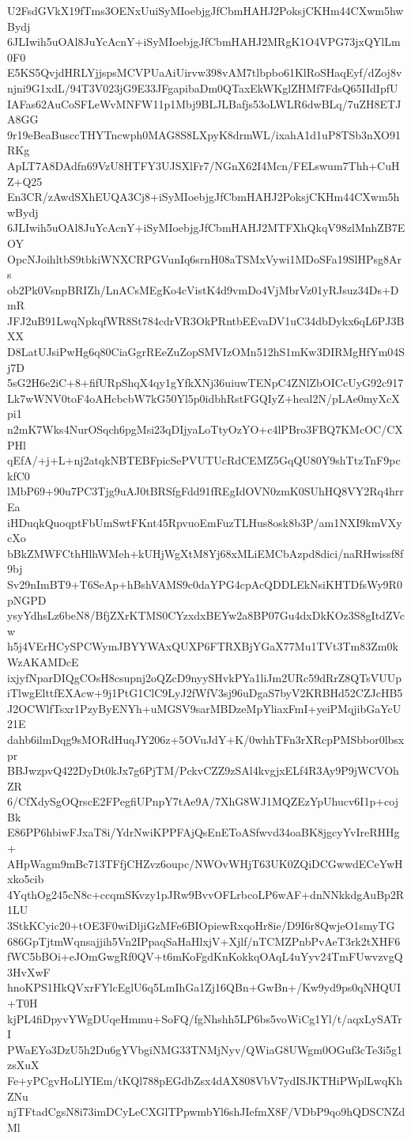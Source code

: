 U2FsdGVkX19fTms3OENxUuiSyMIoebjgJfCbmHAHJ2PoksjCKHm44CXwm5hwBydj
6JLIwih5uOAl8JuYcAcnY+iSyMIoebjgJfCbmHAHJ2MRgK1O4VPG73jxQYlLm0F0
E5KS5QvjdHRLYjjspsMCVPUaAiUirvw398vAM7tlbpbo61KlRoSHaqEyf/dZoj8v
njni9G1xdL/94T3V023jG9E33JFgapibaDm0QTaxEkWKglZHMf7FdsQ65IIdIpfU
IAFas62AuCoSFLeWvMNFW11p1Mbj9BLJLBafjs53oLWLR6dwBLq/7uZH8ETJA8GG
9r19eBeaBusccTHYTncwph0MAG8S8LXpyK8drmWL/ixahA1d1uP8TSb3nXO91RKg
ApLT7A8DAdfn69VzU8HTFY3UJSXlFr7/NGnX62I4Mcn/FELswum7Thh+CuHZ+Q25
En3CR/zAwdSXhEUQA3Cj8+iSyMIoebjgJfCbmHAHJ2PoksjCKHm44CXwm5hwBydj
6JLIwih5uOAl8JuYcAcnY+iSyMIoebjgJfCbmHAHJ2MTFXhQkqV98zlMnhZB7EOY
OpcNJoihltbS9tbkiWNXCRPGVunIq6srnH08aTSMxVywi1MDoSFa19SlHPsg8Ars
ob2Pk0VsnpBRIZh/LnACsMEgKo4cVistK4d9vmDo4VjMbrVz01yRJsuz34Ds+DmR
JFJ2uB91LwqNpkqfWR8St784cdrVR3OkPRntbEEvaDV1uC34dbDykx6qL6PJ3BXX
D8LatUJsiPwHg6q80CiaGgrREeZuZopSMVIzOMn512hS1mKw3DIRMgHfYm04Sj7D
5sG2H6e2iC+8+fifURpShqX4qy1gYfkXNj36uiuwTENpC4ZNlZbOICcUyG92c917
Lk7wWNV0toF4oAHcbcbW7kG50Yl5p0idbhRstFGQIyZ+heal2N/pLAe0myXcXpi1
n2mK7Wks4NurOSqch6pgMsi23qDIjyaLoTtyOzYO+c4lPBro3FBQ7KMcOC/CXPHl
qEfA/+j+L+nj2atqkNBTEBFpicSePVUTUcRdCEMZ5GqQU80Y9shTtzTnF9pckfC0
lMbP69+90u7PC3Tjg9uAJ0tBRSfgFdd91fREgIdOVN0zmK0SUhHQ8VY2Rq4hrrEa
iHDuqkQuoqptFbUmSwtFKnt45RpvuoEmFuzTLHus8osk8b3P/am1NXI9kmVXycXo
bBkZMWFCthHlhWMeh+kUHjWgXtM8Yj68xMLiEMCbAzpd8dici/naRHwissf8f9bj
Sv29nImBT9+T6SeAp+hBshVAMS9c0daYPG4cpAcQDDLEkNsiKHTDfsWy9R0pNGPD
ysyYdhsLz6beN8/BfjZXrKTMS0CYzxdxBEYw2a8BP07Gu4dxDkKOz3S8gItdZVcw
h5j4VErHCySPCWymJBYYWAxQUXP6FTRXBjYGaX77Mu1TVt3Tm83Zm0kWzAKAMDcE
ixjyfNparDIQgCOsH8csupnj2oQZcD9nyySHvkPYa1liJm2URc59dRrZ8QTsVUUp
iTlwgElttfEXAcw+9j1PtG1ClC9LyJ2fWfV3sj96uDgaS7byV2KRBHd52CZJcHB5
J2OCWlfTsxr1PzyByENYh+uMGSV9sarMBDzeMpYliaxFmI+yeiPMqjibGaYcU21E
dahb6ilmDqg9sMORdHuqJY206z+5OVuJdY+K/0whhTFn3rXRcpPMSbbor0lbsxpr
BBJwzpvQ422DyDt0kJx7g6PjTM/PckvCZZ9zSAl4kvgjxELf4R3Ay9P9jWCVOhZR
6/CfXdySgOQrscE2FPegfiUPnpY7tAe9A/7XhG8WJ1MQZEzYpUhucv6I1p+cojBk
E86PP6hbiwFJxaT8i/YdrNwiKPPFAjQsEnEToASfwvd34oaBK8jgcyYvIreRHHg+
AHpWagm9mBc713TFfjCHZvz6oupc/NWOvWHjT63UK0ZQiDCGwwdECeYwHxko5cib
4YqthOg245cN8c+ccqmSKvzy1pJRw9BvvOFLrbcoLP6wAF+dnNNkkdgAuBp2R1LU
3StkKCyic20+tOE3F0wiDljiGzMFe6BIOpiewRxqoHr8ie/D9I6r8QwjeO1smyTG
686GpTjtmWqnsajjih5Vn2IPpaqSaHaHlxjV+Xjlf/nTCMZPnbPvAeT3rk2tXHF6
fWC5bBOi+eJOmGwgRf0QV+t6mKoFgdKnKokkqOAqL4uYyv24TmFUwvzvgQ3HvXwF
hnoKPS1HkQVxrFYlcEglU6q5LmIhGa1Zj16QBn+GwBn+/Kw9yd9ps0qNHQUI+T0H
kjPL4fiDpyvYWgDUqeHmmu+SoFQ/fgNhshh5LP6bs5voWiCg1Yl/t/aqxLySATrI
PWaEYo3DzU5h2Du6gYVbgiNMG33TNMjNyv/QWiaG8UWgm0OGuf3cTe3i5g1zsXuX
Fe+yPCgvHoLlYIEm/tKQl788pEGdbZsx4dAX808VbV7ydISJKTHiPWplLwqKhZNu
njTFtadCgsN8i73imDCyLeCXGlTPpwmbYl6shJIefmX8F/VDbP9qo9hQDSCNZdMl
